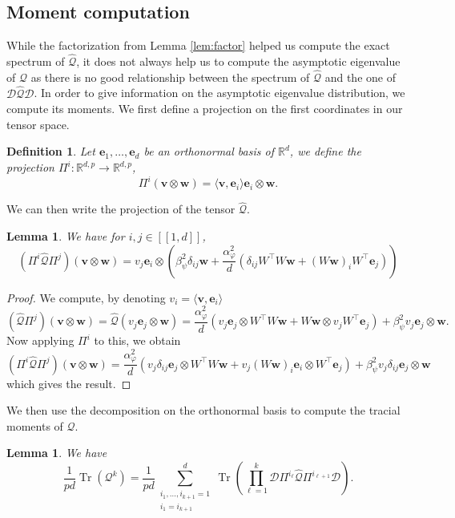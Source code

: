 \documentclass[letterpaper, 10pt, dvipsnames]{article}
\numberwithin{equation}{section}
\DeclareMathOperator{\Tr}{Tr}
\newcommand{\Rbb}{\mathbb{R}}
\newcommand{\D}{\mathcal{D}}
\newcommand{\Q}{\mathcal{Q}}
\newcommand{\ebf}{\mathbf{e}}
\renewcommand{\v}{\mathbf{v}}
\newcommand{\w}{\mathbf{w}}
\renewcommand{\phi}{\varphi}
\renewcommand{\hat}{\widehat}
\newcommand{\unn}[2]{[\![#1,#2]\!]}
\newtheorem{lem}[ccounter]{Lemma}
\newtheorem{defn}[ccounter]{Definition}
\theoremstyle{definition}
\begin{document}
\subsection{Moment computation}
While the factorization from Lemma \ref{lem:factor} helped us compute the exact spectrum of $\hat{\Q}$, it does not always help us to compute the asymptotic eigenvalue of $\Q$ as there is no good relationship between the spectrum of $\hat{\Q}$ and the one of $\D \hat{\Q}\D$. In order to give information on the asymptotic eigenvalue distribution, we compute its moments. We first define a projection on the first coordinates in our tensor space.
\begin{defn}
Let $\mathbf{e}_1,\dots, \mathbf{e}_d$ be an orthonormal basis of $\Rbb^d$, we define the projection $\Pi^{i}:\Rbb^{d,p}\to\Rbb^{d,p}$, 
\[
\Pi^i (\v\otimes\mathbf{w}) = \langle\v,\ebf_i\rangle \ebf_i\otimes \mathbf{w}.
\] 
\end{defn}
We can then write the projection of the tensor $\widehat{\Q}$.
\begin{lem}\label{lem:ProjectionQhat}
We have for $i,j\in\unn{1}{d}$,
\[
  \left(\Pi^{i}\widehat{\Q}\Pi^{j}\right)(\v\otimes \mathbf{w}) = 
  v_j\ebf_i\otimes \left(
    \beta_\psi^2\delta_{ij}\w+\frac{\alpha_\phi^2}{d}\left(
      \delta_{ij} W^\top W\w+(W\w)_iW^\top\ebf_j
    \right)
  \right)
\]
\end{lem}
\begin{proof}
  We compute, by denoting $v_i=\langle \v,\mathbf{e}_i\rangle$ 
  \[
    (\widehat{\Q}\Pi^j)(\v\otimes \mathbf{w})
    =
    \widehat{\Q}(v_j\ebf_j\otimes \w) 
    =
    \frac{\alpha_\phi^2}{d}
    \left(
      v_j\ebf_j\otimes W^\top W \w + W\w\otimes v_j W^\top \ebf_j 
    \right)
    +
    \beta^2_\psi v_j\ebf_j\otimes \w.
  \]
  Now applying $\Pi^i$ to this, we obtain 
  \[
    (\Pi^i\widehat{\Q}\Pi^j)(\v\otimes \w)
    =
    \frac{\alpha_\phi^2}{d}\left(
      v_j\delta_{ij}\ebf_j\otimes W^\top W \w + v_j(W\w)_i\ebf_i\otimes W^\top \ebf_j
    \right)
    +
    \beta_\psi^2 v_j \delta_{ij}\ebf_j\otimes \w
  \]
  which gives the result.
\end{proof}
We then use the decomposition on the orthonormal basis to compute the tracial moments of $\Q$.
\begin{lem}\label{lem:TrQrepresentation}
  We have
  \[
  \frac{1}{pd}
    \Tr(\Q^k)
  =
  \frac{1}{pd}\sum_{\substack{i_1,\dots,i_{k+1}=1\\i_1=i_{k+1}}}^d \Tr\left(
    \prod_{\ell=1}^k \D \Pi^{i_\ell}\widehat{\Q}\Pi^{i_{\ell+1}}\D
  \right).
  \]
\end{lem}
\end{document}
